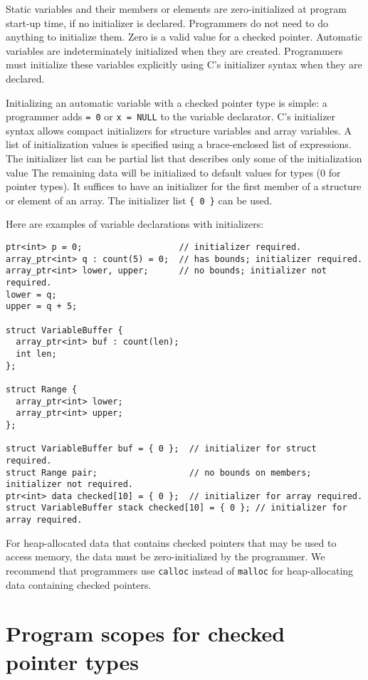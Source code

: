 Static variables and their members or elements are zero-initialized at program
start-up time, if no initializer is declared.  Programmers do not need to do anything to
initialize them.  Zero is a valid value for a checked pointer.
Automatic variables are indeterminately initialized when they are created.
Programmers must initialize these variables explicitly using C's initializer syntax
when they are declared.

Initializing an automatic variable with a checked pointer type is simple: a programmer adds
\lstinline+= 0+ or \lstinline+x = NULL+ to the variable declarator. C's initializer syntax 
allows compact initializers for structure variables and array variables.
A list of initialization values is specified using a brace-enclosed list of expressions.
The initializer list can be partial list that describes
only some of the initialization value  The remaining data will be initialized to default values
for types (0 for pointer types). It suffices to have an initializer for the first member
of a structure or element of an array. The initializer list \lstinline+{ 0 }+ can be used.

Here are examples of variable declarations with initializers:
\begin{lstlisting}
ptr<int> p = 0;                   // initializer required.
array_ptr<int> q : count(5) = 0;  // has bounds; initializer required.
array_ptr<int> lower, upper;      // no bounds; initializer not required.
lower = q;
upper = q + 5;

struct VariableBuffer {
  array_ptr<int> buf : count(len);
  int len;
};

struct Range {
  array_ptr<int> lower;
  array_ptr<int> upper;
};

struct VariableBuffer buf = { 0 };  // initializer for struct required.
struct Range pair;                  // no bounds on members; initializer not required.
ptr<int> data checked[10] = { 0 };  // initializer for array required.
struct VariableBuffer stack checked[10] = { 0 }; // initializer for array required.
\end{lstlisting}

For heap-allocated data that contains checked pointers that may be used to access memory, the
data must be zero-initialized by the programmer.  We recommend that programmers use
\lstinline+calloc+ instead of \lstinline+malloc+ for heap-allocating data containing checked pointers.

\section{Program scopes for checked pointer types}

